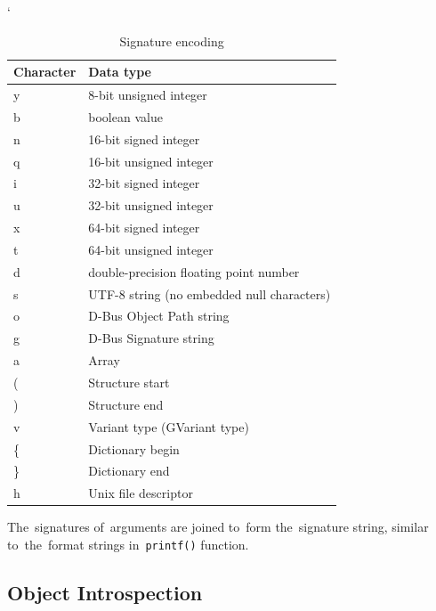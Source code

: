 \documentclass[conference]{IEEEtran}
\begin{document}
\FloatBarrier
\begin{table}[!h]
\catcode`
\caption{Signature encoding}
\label{tab:tab1}
\begin{center}
	\begin{tabular}{| l | l |}
	\hline
	\textbf{Character} & \textbf{Data type} \\ \hline
	y & 8-bit unsigned integer \\ \hline
	b & boolean value \\ \hline
	n & 16-bit signed integer \\ \hline
	q & 16-bit unsigned integer \\ \hline
	i & 32-bit signed integer \\ \hline
	u & 32-bit unsigned integer \\ \hline
	x & 64-bit signed integer \\ \hline
	t & 64-bit unsigned integer \\ \hline
	d & double-precision floating point number \\ \hline
	s & UTF-8 string (no embedded null characters) \\ \hline
	o & D-Bus Object Path string \\ \hline
	g & D-Bus Signature string \\ \hline
	a & Array \\ \hline
	( & Structure start \\ \hline
	) & Structure end \\ \hline
	v & Variant type (GVariant type) \\ \hline
	\{ & Dictionary begin \\ \hline
	\} & Dictionary end \\ \hline
	h & Unix file descriptor \\
	\hline
	\end{tabular}
\end{center}
\end{table}
\FloatBarrier

The~signatures of~arguments are joined to~form the~signature
string, similar to~the~format strings
in~\texttt{printf()} function.

\subsection{Object Introspection}
\end{document}
